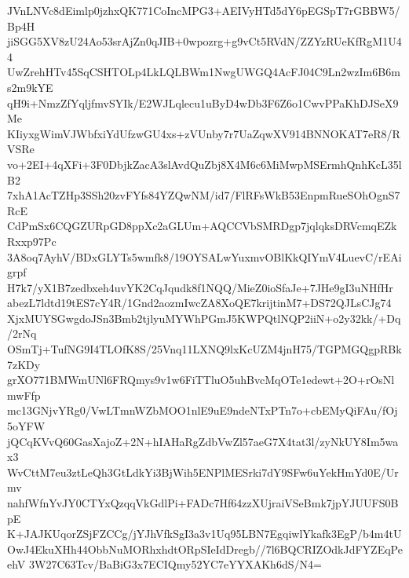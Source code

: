 JVnLNVc8dEimlp0jzhxQK771CoIncMPG3+AEIVyHTd5dY6pEGSpT7rGBBW5/Bp4H
jiSGG5XV8zU24Ao53srAjZn0qJIB+0wpozrg+g9vCt5RVdN/ZZYzRUeKfRgM1U44
UwZrehHTv45SqCSHTOLp4LkLQLBWm1NwgUWGQ4AcFJ04C9Ln2wzIm6B6ms2m9kYE
qH9i+NmzZfYqljfmvSYIk/E2WJLqlecu1uByD4wDb3F6Z6o1CwvPPaKhDJSeX9Me
KIiyxgWimVJWbfxiYdUfzwGU4xs+zVUnby7r7UaZqwXV914BNNOKAT7eR8/RVSRe
vo+2EI+4qXFi+3F0DbjkZacA3slAvdQuZbj8X4M6c6MiMwpMSErmhQnhKcL35lB2
7xhA1AcTZHp3SSh20zvFYfs84YZQwNM/id7/FlRFsWkB53EnpmRueSOhOgnS7RcE
CdPmSx6CQGZURpGD8ppXc2aGLUm+AQCCVbSMRDgp7jqlqksDRVcmqEZkRxxp97Pc
3A8oq7AyhV/BDxGLYTs5wmfk8/19OYSALwYuxmvOBlKkQIYmV4LuevC/rEAigrpf
H7k7/yX1B7zedbxeh4uvYK2CqJqudk8f1NQQ/MieZ0ioSfaJe+7JHe9gI3uNHfHr
abezL7ldtd19tES7cY4R/1Gnd2aozmIwcZA8XoQE7krijtinM7+DS72QJLsCJg74
XjxMUYSGwgdoJSn3Bmb2tjlyuMYWhPGmJ5KWPQtlNQP2iiN+o2y32kk/+Dq/2rNq
OSmTj+TufNG9I4TLOfK8S/25Vnq11LXNQ9lxKcUZM4jnH75/TGPMGQgpRBk7zKDy
grXO771BMWmUNl6FRQmys9v1w6FiTTluO5uhBvcMqOTe1edewt+2O+rOsNlmwFfp
mc13GNjvYRg0/VwLTmnWZbMOO1nlE9uE9ndeNTxPTn7o+cbEMyQiFAu/fOj5oYFW
jQCqKVvQ60GasXajoZ+2N+hIAHaRgZdbVwZl57aeG7X4tat3l/zyNkUY8Im5wax3
WvCttM7eu3ztLeQh3GtLdkYi3BjWih5ENPlMESrki7dY9SFw6uYekHmYd0E/Urmv
nahfWfnYvJY0CTYxQzqqVkGdlPi+FADc7Hf64zzXUjraiVSeBmk7jpYJUUFS0BpE
K+JAJKUqorZSjFZCCg/jYJhVfkSgI3a3v1Uq95LBN7EgqiwlYkafk3EgP/b4m4tU
OwJ4EkuXHh44ObbNuMORhxhdtORpSIeIdDregb//7l6BQCRIZOdkJdFYZEqPeehV
3W27C63Tcv/BaBiG3x7ECIQmy52YC7eYYXAKh6dS/N4=
